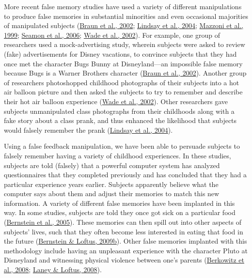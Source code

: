 \documentclass[
]{krantz}
\begin{document}
More recent false memory studies have used a variety of different manipulations to produce false memories in substantial minorities and even occasional majorities of manipulated subjects (\protect\hyperlink{ref-Braun2002}{Braun et al., 2002}; \protect\hyperlink{ref-Lindsay2004}{Lindsay et al., 2004}; \protect\hyperlink{ref-Mazzoni1999}{Mazzoni et al., 1999}; \protect\hyperlink{ref-Seamon2006}{Seamon et al., 2006}; \protect\hyperlink{ref-Wade2002}{Wade et al., 2002}). For example, one group of researchers used a mock-advertising study, wherein subjects were asked to review (fake) advertisements for Disney vacations, to convince subjects that they had once met the character Bugs Bunny at Disneyland---an impossible false memory because Bugs is a Warner Brothers character (\protect\hyperlink{ref-Braun2002}{Braun et al., 2002}). Another group of researchers photoshopped childhood photographs of their subjects into a hot air balloon picture and then asked the subjects to try to remember and describe their hot air balloon experience (\protect\hyperlink{ref-Wade2002}{Wade et al., 2002}). Other researchers gave subjects unmanipulated class photographs from their childhoods along with a fake story about a class prank, and thus enhanced the likelihood that subjects would falsely remember the prank (\protect\hyperlink{ref-Lindsay2004}{Lindsay et al., 2004}).

Using a false feedback manipulation, we have been able to persuade subjects to falsely remember having a variety of childhood experiences. In these studies, subjects are told (falsely) that a powerful computer system has analyzed questionnaires that they completed previously and has concluded that they had a particular experience years earlier. Subjects apparently believe what the computer says about them and adjust their memories to match this new information. A variety of different false memories have been implanted in this way. In some studies, subjects are told they once got sick on a particular food (\protect\hyperlink{ref-Bernstein2005}{Bernstein et al., 2005}). These memories can then spill out into other aspects of subjects' lives, such that they often become less interested in eating that food in the future (\protect\hyperlink{ref-Bernstein2009b}{Bernstein \& Loftus, 2009b}). Other false memories implanted with this methodology include having an unpleasant experience with the character Pluto at Disneyland and witnessing physical violence between one's parents (\protect\hyperlink{ref-Berkowitz2008}{Berkowitz et al., 2008}; \protect\hyperlink{ref-Laney2008}{Laney \& Loftus, 2008}).
\end{document}
